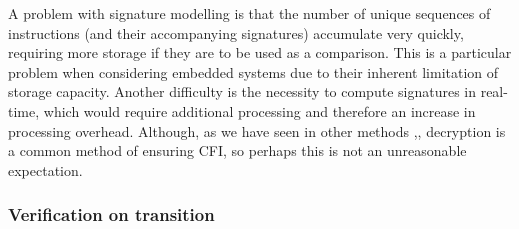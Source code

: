 A problem with signature modelling is that the number of unique sequences of instructions (and their accompanying signatures) accumulate very quickly, requiring more storage if they are to be used as a comparison. This is a particular problem when considering embedded systems due to their inherent limitation of storage capacity. Another difficulty is the necessity to compute signatures in real-time, which would require additional processing and therefore an increase in processing overhead. Although, as we have seen in other methods \cite{Davi2015},\cite{Lee2019}, decryption is a common method of ensuring CFI, so perhaps this is not an unreasonable expectation.

\subsubsection{Verification on transition}


